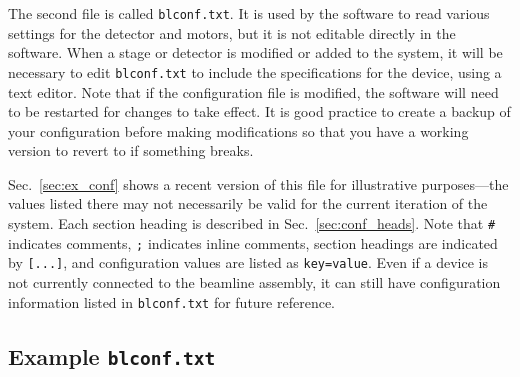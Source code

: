 The second file is called \texttt{blconf.txt}. It is used by the software to read various settings for the detector and motors, but it is not editable directly in the software. When a stage or detector is modified or added to the system, it will be necessary to edit \texttt{blconf.txt} to include the specifications for the device, using a text editor. Note that if the configuration file is modified, the software will need to be restarted for changes to take effect. It is good practice to create a backup of your configuration before making modifications so that you have a working version to revert to if something breaks.

Sec.~\ref{sec:ex_conf} shows a recent version of this file for illustrative purposes---the values listed there may not necessarily be valid for the current iteration of the system. Each section heading is described in Sec.~\ref{sec:conf_heads}. Note that \texttt{\#} indicates comments, \texttt{;} indicates inline comments, section headings are indicated by \verb|[...]|, and configuration values are listed as \verb|key=value|. Even if a device is not currently connected to the beamline assembly, it can still have configuration information listed in \texttt{blconf.txt} for future reference.

\subsection{Example \texttt{blconf.txt} \label{sec:ex_conf}}

